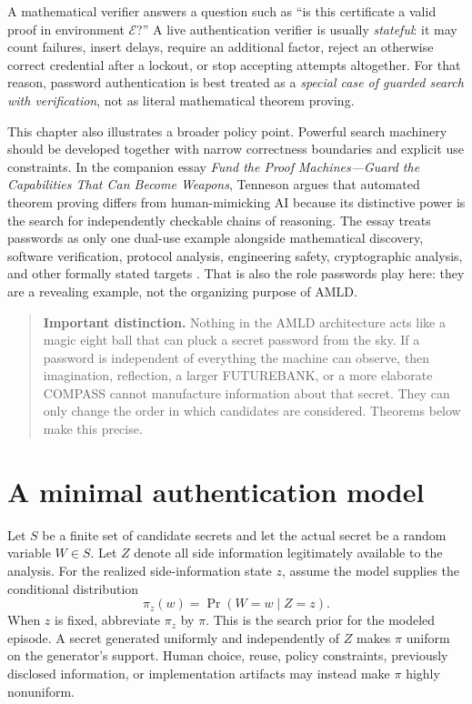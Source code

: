 \documentclass[11pt,openany]{book}
\theoremstyle{definition}
\theoremstyle{remark}
\newenvironment{warningbox}{\begin{quote}\small\color{red!50!black}\textbf{Important distinction.} }{\end{quote}}
\newcommand{\Env}{\mathcal{E}}
\begin{document}
A mathematical verifier answers a question such as ``is this certificate a valid proof in environment $\Env$?'' A live authentication verifier is usually \emph{stateful}: it may count failures, insert delays, require an additional factor, reject an otherwise correct credential after a lockout, or stop accepting attempts altogether. For that reason, password authentication is best treated as a \emph{special case of guarded search with verification}, not as literal mathematical theorem proving.

This chapter also illustrates a broader policy point. Powerful search machinery should be developed together with narrow correctness boundaries and explicit use constraints. In the companion essay \emph{Fund the Proof Machines---Guard the Capabilities That Can Become Weapons}, Tenneson argues that automated theorem proving differs from human-mimicking AI because its distinctive power is the search for independently checkable chains of reasoning. The essay treats passwords as only one dual-use example alongside mathematical discovery, software verification, protocol analysis, engineering safety, cryptographic analysis, and other formally stated targets \cite{TennesonProofMachines2026}. That is also the role passwords play here: they are a revealing example, not the organizing purpose of AMLD.

\begin{warningbox}
Nothing in the AMLD architecture acts like a magic eight ball that can pluck a secret password from the sky. If a password is independent of everything the machine can observe, then imagination, reflection, a larger FUTUREBANK, or a more elaborate COMPASS cannot manufacture information about that secret. They can only change the order in which candidates are considered. Theorems below make this precise.
\end{warningbox}

\section{A minimal authentication model}
Let $S$ be a finite set of candidate secrets and let the actual secret be a random variable $W\in S$. Let $Z$ denote all side information legitimately available to the analysis. For the realized side-information state $z$, assume the model supplies the conditional distribution
\[
\pi_z(w)=\Pr(W=w\mid Z=z).
\]
When $z$ is fixed, abbreviate $\pi_z$ by $\pi$. This is the search prior for the modeled episode. A secret generated uniformly and independently of $Z$ makes $\pi$ uniform on the generator's support. Human choice, reuse, policy constraints, previously disclosed information, or implementation artifacts may instead make $\pi$ highly nonuniform.
\end{document}
